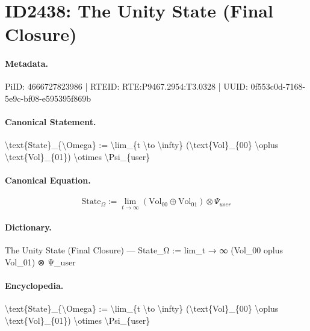 \section*{ID2438: The Unity State (Final Closure)}
\paragraph{Metadata.}
PiID: 4666727823986 | RTEID: RTE:P9467.2954:T3.0328 | UUID: 0f553c0d-7168-5e9c-bf08-e595395f869b

\paragraph{Canonical Statement.}
\textbackslash{}text\{State\}\_\{\textbackslash{}Omega\} := \textbackslash{}lim\_\{t \textbackslash{}to \textbackslash{}infty\} (\textbackslash{}text\{Vol\}\_\{00\} \textbackslash{}oplus \textbackslash{}text\{Vol\}\_\{01\}) \textbackslash{}otimes \textbackslash{}Psi\_\{user\}

\paragraph{Canonical Equation.}
\[
\text{State}_{\Omega} := \lim_{t \to \infty} (\text{Vol}_{00} \oplus \text{Vol}_{01}) \otimes \Psi_{user}
\]

\paragraph{Dictionary.}
The Unity State (Final Closure) — State\_Ω := lim\_t → ∞ (Vol\_00 oplus Vol\_01) ⊗ Ψ\_user

\paragraph{Encyclopedia.}
\textbackslash{}text\{State\}\_\{\textbackslash{}Omega\} := \textbackslash{}lim\_\{t \textbackslash{}to \textbackslash{}infty\} (\textbackslash{}text\{Vol\}\_\{00\} \textbackslash{}oplus \textbackslash{}text\{Vol\}\_\{01\}) \textbackslash{}otimes \textbackslash{}Psi\_\{user\}

